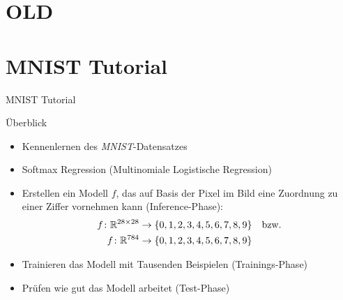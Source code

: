 \documentclass[utf8, smaller, c]{beamer}
\begin{document}
\iffalse
\section{OLD}
\section{MNIST Tutorial}
\begin{frame}{MNIST Tutorial}
	\begin{block}{Überblick}
		\begin{itemize}
			\item Kennenlernen des \textit{MNIST}-Datensatzes
			\item Softmax Regression (Multinomiale Logistische Regression)
			\item Erstellen ein Modell $f$, das auf Basis der Pixel im Bild eine Zuordnung zu einer Ziffer vornehmen kann 
			(Inference-Phase):
				\begin{align*}
					f\colon \mathbb{R}^{28\times 28} &\rightarrow \{0,1,2,3,4,5,6,7,8,9\} \text{\quad bzw.} \\
					f\colon \mathbb{R}^{784} &\rightarrow \{0,1,2,3,4,5,6,7,8,9\}
				\end{align*}
			\item Trainieren das Modell mit Tausenden Beispielen (Trainings-Phase)
			\item Prüfen wie gut das Modell arbeitet (Test-Phase)
		\end{itemize}
	\end{block}
	
	\framebreak


\end{frame}
\end{document}

